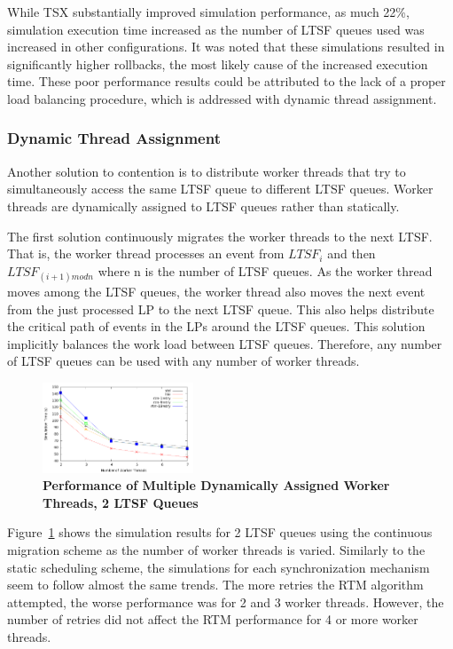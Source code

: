 \documentclass{sig-alternate}
\begin{document}
While TSX substantially improved simulation performance, as much 22\%, simulation
execution time increased as the number of LTSF queues used was increased in other
configurations.  It was noted that these simulations resulted in significantly higher
rollbacks, the most likely cause of the increased execution time.  These poor performance
results could be attributed to the lack of a proper load balancing procedure, which is
addressed with dynamic thread assignment.

\subsubsection{Dynamic Thread Assignment}

Another solution to contention is to distribute worker threads that try to simultaneously
access the same LTSF queue to different LTSF queues.  Worker threads are dynamically
assigned to LTSF queues rather than statically.

The first solution continuously migrates the worker threads to the next LTSF.  That is,
the worker thread processes an event from $LTSF_i$ and then $LTSF_{(i+1)mod n}$ where n is
the number of LTSF queues.  As the worker thread moves among the LTSF queues, the worker
thread also moves the next event from the just processed LP to the next LTSF queue.  This
also helps distribute the critical path of events in the LPs around the LTSF queues.  This
solution implicitly balances the work load between LTSF queues.  Therefore, any number of
LTSF queues can be used with any number of worker threads.

\begin{figure}
    \centering
    \graphicspath{ {./figures/} }
    \includegraphics[width=0.4\textwidth,keepaspectratio]{hugeepidemicsim-CONTmig-timeVSthreads-multiset-2schQ}
    \caption{\textbf{Performance of Multiple Dynamically Assigned Worker Threads, 2 LTSF Queues}}
    \label{fig:contThrMig_timeVSthreads_2schQ}
\end{figure}

Figure~\ref{fig:contThrMig_timeVSthreads_2schQ} shows the simulation results for 2 LTSF
queues using the continuous migration scheme as the number of worker threads is varied.
Similarly to the static scheduling scheme, the simulations for each synchronization
mechanism seem to follow almost the same trends.  The more retries the RTM algorithm
attempted, the worse performance was for 2 and 3 worker threads.  However, the number of
retries did not affect the RTM performance for 4 or more worker threads.
\end{document}
